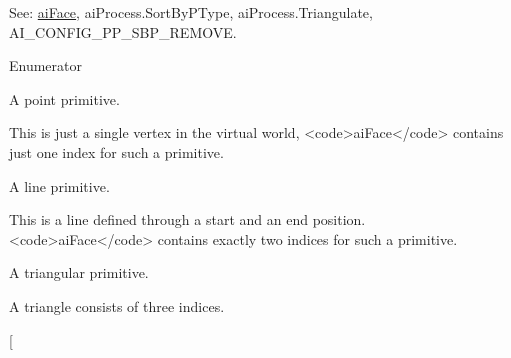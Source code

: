 See\+: {\ttfamily \hyperlink{structassimp_1_1mesh_1_1ai_face}{ai\+Face}}, {\ttfamily ai\+Process.\+Sort\+By\+P\+Type}, {\ttfamily ai\+Process.\+Triangulate}, {\ttfamily A\+I\+\_\+\+C\+O\+N\+F\+I\+G\+\_\+\+P\+P\+\_\+\+S\+B\+P\+\_\+\+R\+E\+M\+O\+V\+E}. \begin{Desc}
\item[Enumerator]\par
\begin{description}
\item[{\em 
\hypertarget{namespaceassimp_1_1mesh_abc539dabedce7b606660c34e4bf55160a58249197e1431cde9593723f83a42ca4}{P\+O\+I\+N\+T}\label{namespaceassimp_1_1mesh_abc539dabedce7b606660c34e4bf55160a58249197e1431cde9593723f83a42ca4}
}]A point primitive. \begin{DoxyVerb} This is just a single vertex in the virtual world,
 <code>aiFace</code> contains just one index for such a primitive.\end{DoxyVerb}
 \item[{\em 
\hypertarget{namespaceassimp_1_1mesh_abc539dabedce7b606660c34e4bf55160a511c7a35e80fb98947066811053d6096}{L\+I\+N\+E}\label{namespaceassimp_1_1mesh_abc539dabedce7b606660c34e4bf55160a511c7a35e80fb98947066811053d6096}
}]A line primitive. \begin{DoxyVerb} This is a line defined through a start and an end position.
 <code>aiFace</code> contains exactly two indices for such a primitive.\end{DoxyVerb}
 \item[{\em 
\hypertarget{namespaceassimp_1_1mesh_abc539dabedce7b606660c34e4bf55160ac2a455a7c72f8cb2aea05a3a811bf60c}{T\+R\+I\+A\+N\+G\+L\+E}\label{namespaceassimp_1_1mesh_abc539dabedce7b606660c34e4bf55160ac2a455a7c72f8cb2aea05a3a811bf60c}
}]A triangular primitive. \begin{DoxyVerb} A triangle consists of three indices.\end{DoxyVerb}
 \item[{\em 
}
\end{description}
\end{Desc}
